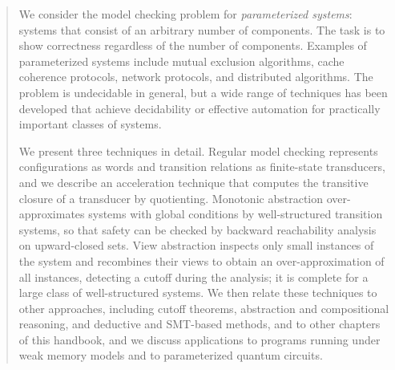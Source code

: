 \begin{abstract}
We consider the model checking problem for \emph{parameterized systems}:
systems that consist of an arbitrary number of components. The task is to show
correctness regardless of the number of components. Examples of parameterized
systems include mutual exclusion algorithms, cache coherence protocols,
network protocols, and distributed algorithms. The problem is undecidable in
general, but a wide range of techniques has been developed that achieve
decidability or effective automation for practically important classes of
systems.

We present three techniques in detail. Regular model checking represents
configurations as words and transition relations as finite-state transducers,
and we describe an acceleration technique that computes the transitive closure
of a transducer by quotienting. Monotonic abstraction over-approximates
systems with global conditions by well-structured transition systems, so that
safety can be checked by backward reachability analysis on upward-closed sets.
View abstraction inspects only small instances of the system and recombines
their views to obtain an over-approximation of all instances, detecting a
cutoff during the analysis; it is complete for a large class of well-structured
systems. We then relate these techniques to other approaches, including cutoff
theorems, abstraction and compositional reasoning, and deductive and SMT-based
methods, and to other chapters of this handbook, and we discuss applications to
programs running under weak memory models and to parameterized quantum
circuits.
\end{abstract}
